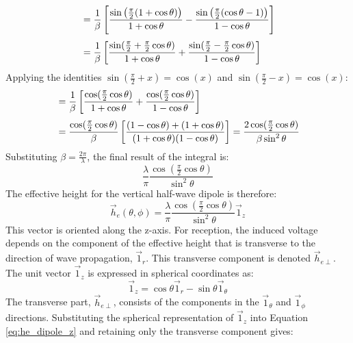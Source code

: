 \begin{align}
	&= \frac{1}{\beta} \left[ \frac{\sin\left(\frac{\pi}{2}(1+\cos\theta)\right)}{1+\cos\theta} - \frac{\sin\left(\frac{\pi}{2}(\cos\theta-1)\right)}{1-\cos\theta} \right] \\[\jot]
	&= \frac{1}{\beta} \left[ \frac{\sin(\frac{\pi}{2}+\frac{\pi}{2}\cos\theta)}{1+\cos\theta} + \frac{\sin(\frac{\pi}{2}-\frac{\pi}{2}\cos\theta)}{1-\cos\theta} \right]
\end{align}
\vspace{1em}
Applying the identities $\sin(\frac{\pi}{2}+x) = \cos(x)$ and $\sin(\frac{\pi}{2}-x) = \cos(x)$:
\vspace{1em}
\begin{align}
	&= \frac{1}{\beta} \left[ \frac{\cos(\frac{\pi}{2}\cos\theta)}{1+\cos\theta} + \frac{\cos(\frac{\pi}{2}\cos\theta)}{1-\cos\theta} \right] \\[\jot]
	&= \frac{\cos(\frac{\pi}{2}\cos\theta)}{\beta} \left[ \frac{(1-\cos\theta) + (1+\cos\theta)}{(1+\cos\theta)(1-\cos\theta)} \right] = \frac{2\cos(\frac{\pi}{2}\cos\theta)}{\beta\sin^2\theta}
\end{align}
\vspace{1em}
Substituting $\beta=\frac{2\pi}{\lambda}$, the final result of the integral is:
\begin{equation}
	\frac{\lambda}{\pi} \frac{\cos(\frac{\pi}{2}\cos\theta)}{\sin^2\theta}
\end{equation}
\vspace{0.5em}
The effective height for the vertical half-wave dipole is therefore:
\begin{equation}
	\vec{h}_e(\theta, \phi) = \frac{\lambda}{\pi} \frac{\cos(\frac{\pi}{2}\cos\theta)}{\sin^2\theta} \vec{1}_z
	\label{eq:he_dipole_z}
\end{equation}
\vspace{0.5em}
This vector is oriented along the z-axis. For reception, the induced voltage depends on the component of the effective height that is transverse to the direction of wave propagation, $\vec{1}_r$. This transverse component is denoted $\vec{h}_{e\perp}$. The unit vector $\vec{1}_z$ is expressed in spherical coordinates as:
\begin{equation}
	\vec{1}_z = \cos\theta \vec{1}_r - \sin\theta \vec{1}_\theta
\end{equation}
\vspace{0.5em}
The transverse part, $\vec{h}_{e\perp}$, consists of the components in the $\vec{1}_\theta$ and $\vec{1}_\phi$ directions. Substituting the spherical representation of $\vec{1}_z$ into Equation \eqref{eq:he_dipole_z} and retaining only the transverse component gives:

